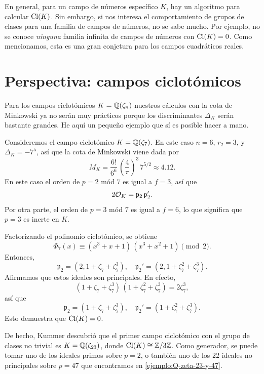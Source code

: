 En general, para un campo de números específico $K$, hay un algoritmo para
calcular $\operatorname{Cl} (K)$. Sin embargo, si nos interesa el comportamiento de grupos de
clases para una familia de campos de números, no se sabe mucho. Por ejemplo, no
se conoce \emph{ninguna} familia infinita de campos de números con
$\operatorname{Cl} (K) = 0$. Como mencionamos, esta es una gran conjetura para los campos
cuadráticos reales.


\section{Perspectiva: campos ciclotómicos}

Para los campos ciclotómicos $K = \mathbb{Q} (\zeta_n)$ nuestros cálculos con la cota
de Minkowski ya no serán muy prácticos porque los discriminantes $\Delta_K$
serán bastante grandes. He aquí un pequeño ejemplo que sí es posible hacer
a mano.

\begin{ejemplo}
  Consideremos el campo ciclotómico $K = \mathbb{Q} (\zeta_7)$. En este caso
  $n = 6$, $r_2 = 3$, y $\Delta_K = -7^5$, así que la cota de Minkowski
  viene dada por
  $$M_K = \frac{6!}{6^6} \, \left(\frac{4}{\pi}\right)^3 \, 7^{5/2} \approx 4.12.$$
  En este caso el orden de $p = 2$ mód $7$ es igual a $f = 3$, así que
  $$2\mathcal{O}_K = \mathfrak{p}_2 \, \mathfrak{p}_2'.$$
  Por otra parte, el orden de $p = 3$ mód $7$ es igual a $f = 6$, lo que
  significa que $p = 3$ es inerte en $K$.

  Factorizando el polinomio ciclotómico, se obtiene
  $$\Phi_7 (x) \equiv (x^3 + x + 1)\,(x^3 + x^2 + 1) \pmod{2}.$$
  Entonces,
  \[ \mathfrak{p}_2 = (2, 1 + \zeta_7 + \zeta_7^3), \quad
     \mathfrak{p}_2' = (2, 1 + \zeta_7^2 + \zeta_7^3). \]
  Afirmamos que estos ideales son principales. En efecto,
  $$(1 + \zeta_7 + \zeta_7^3)\,(1 + \zeta_7^2 + \zeta_7^3) = 2\zeta_7^3,$$
  así que
  \[ \mathfrak{p}_2 = (1 + \zeta_7 + \zeta_7^3), \quad
     \mathfrak{p}_2' = (1 + \zeta_7^2 + \zeta_7^3). \]
  Esto demuestra que $\operatorname{Cl} (K) = 0$.
\end{ejemplo}

De hecho, Kummer descubrió que el primer campo ciclotómico con el grupo de
clases no trivial es $K = \mathbb{Q} (\zeta_{23})$, donde $\operatorname{Cl} (K) \cong \mathbb{Z}/3\mathbb{Z}$.
Como generador, se puede tomar uno de los ideales primos sobre $p = 2$,
o también uno de los $22$ ideales no principales sobre $p = 47$ que encontramos
en \ref{ejemplo:Q-zeta-23-y-47}.

